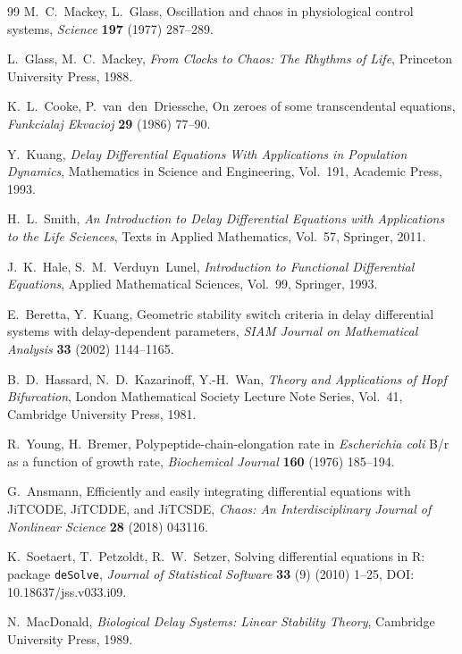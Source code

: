 \documentclass[sn-mathphys,Numbered]{sn-jnl}
\theoremstyle{thmstyleone}
\theoremstyle{thmstyletwo}
\theoremstyle{thmstylethree}
\begin{document}
\begin{thebibliography}{99}
M.~C.~Mackey, L.~Glass,
Oscillation and chaos in physiological control systems,
\emph{Science} \textbf{197} (1977) 287--289.

L.~Glass, M.~C.~Mackey,
\emph{From Clocks to Chaos: The Rhythms of Life}, Princeton University
Press, 1988.

K.~L.~Cooke, P.~van~den~Driessche,
On zeroes of some transcendental equations,
\emph{Funkcialaj Ekvacioj} \textbf{29} (1986) 77--90.

Y.~Kuang,
\emph{Delay Differential Equations With Applications in Population
Dynamics}, Mathematics in Science and Engineering, Vol.~191,
Academic Press, 1993.

H.~L.~Smith,
\emph{An Introduction to Delay Differential Equations with Applications
to the Life Sciences}, Texts in Applied Mathematics, Vol.~57, Springer,
2011.

J.~K.~Hale, S.~M.~Verduyn~Lunel,
\emph{Introduction to Functional Differential Equations}, Applied
Mathematical Sciences, Vol.~99, Springer, 1993.

E.~Beretta, Y.~Kuang,
Geometric stability switch criteria in delay differential systems with
delay-dependent parameters,
\emph{SIAM Journal on Mathematical Analysis} \textbf{33} (2002) 1144--1165.

B.~D.~Hassard, N.~D.~Kazarinoff, Y.-H.~Wan,
\emph{Theory and Applications of Hopf Bifurcation}, London Mathematical
Society Lecture Note Series, Vol.~41, Cambridge University Press, 1981.

R.~Young, H.~Bremer,
Polypeptide-chain-elongation rate in \emph{Escherichia coli} B/r as a
function of growth rate,
\emph{Biochemical Journal} \textbf{160} (1976) 185--194.

G.~Ansmann,
Efficiently and easily integrating differential equations with JiTCODE,
JiTCDDE, and JiTCSDE,
\emph{Chaos: An Interdisciplinary Journal of Nonlinear Science}
\textbf{28} (2018) 043116.

K.~Soetaert, T.~Petzoldt, R.~W.~Setzer,
Solving differential equations in R: package \texttt{deSolve},
\emph{Journal of Statistical Software} \textbf{33} (9) (2010) 1--25,
DOI: 10.18637/jss.v033.i09.

N.~MacDonald,
\emph{Biological Delay Systems: Linear Stability Theory}, Cambridge
University Press, 1989.


\end{thebibliography}
\end{document}
